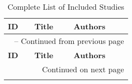 \begin{landscape}
    \footnotesize
    \begin{longtable}{|p{0.5cm}|p{9cm}|p{7cm}|}
    \caption{Complete List of Included Studies}\label{tab:all_papers_compact}\\
    \hline
    \textbf{ID} & \textbf{Title} & \textbf{Authors} \\
    \hline
    \endfirsthead
    
    \multicolumn{3}{c}{\tablename\ \thetable{} -- Continued from previous page} \\
    \hline
    \textbf{ID} & \textbf{Title} & \textbf{Authors} \\
    \hline
    \endhead
    
    \hline 
    \multicolumn{3}{r}{Continued on next page} \\
    \endfoot
    
    \hline
    \endlastfoot
    

\end{longtable}
\end{landscape}
